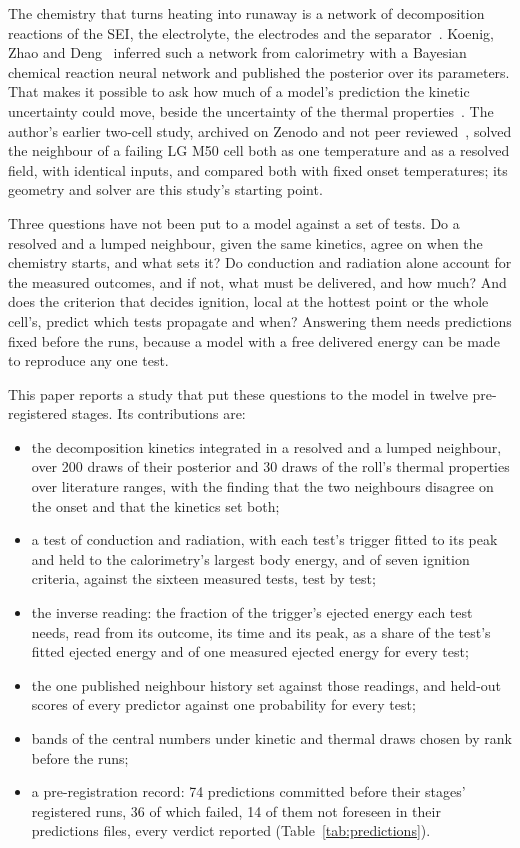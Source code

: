 \documentclass[preprint,12pt]{elsarticle}
\begin{document}
The chemistry that turns heating into runaway is a network of decomposition reactions of the SEI, the electrolyte, the electrodes and the separator~\cite{feng2018mechanism}. Koenig, Zhao and Deng~\cite{koenig2025uncertainty} inferred such a network from calorimetry with a Bayesian chemical reaction neural network and published the posterior over its parameters. That makes it possible to ask how much of a model's prediction the kinetic uncertainty could move, beside the uncertainty of the thermal properties~\cite{oregan2022thermal,chen2021simplified}. The author's earlier two-cell study, archived on Zenodo and not peer reviewed~\cite{satte2026twocell}, solved the neighbour of a failing LG M50 cell both as one temperature and as a resolved field, with identical inputs, and compared both with fixed onset temperatures; its geometry and solver are this study's starting point.

Three questions have not been put to a model against a set of tests. Do a resolved and a lumped neighbour, given the same kinetics, agree on when the chemistry starts, and what sets it? Do conduction and radiation alone account for the measured outcomes, and if not, what must be delivered, and how much? And does the criterion that decides ignition, local at the hottest point or the whole cell's, predict which tests propagate and when? Answering them needs predictions fixed before the runs, because a model with a free delivered energy can be made to reproduce any one test.

This paper reports a study that put these questions to the model in twelve pre-registered stages. Its contributions are:
\begin{itemize}
\item the decomposition kinetics integrated in a resolved and a lumped neighbour, over 200 draws of their posterior and 30 draws of the roll's thermal properties over literature ranges, with the finding that the two neighbours disagree on the onset and that the kinetics set both;
\item a test of conduction and radiation, with each test's trigger fitted to its peak and held to the calorimetry's largest body energy, and of seven ignition criteria, against the sixteen measured tests, test by test;
\item the inverse reading: the fraction of the trigger's ejected energy each test needs, read from its outcome, its time and its peak, as a share of the test's fitted ejected energy and of one measured ejected energy for every test;
\item the one published neighbour history set against those readings, and held-out scores of every predictor against one probability for every test;
\item bands of the central numbers under kinetic and thermal draws chosen by rank before the runs;
\item a pre-registration record: 74 predictions committed before their stages' registered runs, 36 of which failed, 14 of them not foreseen in their predictions files, every verdict reported (Table~\ref{tab:predictions}).
\end{itemize}
\end{document}
